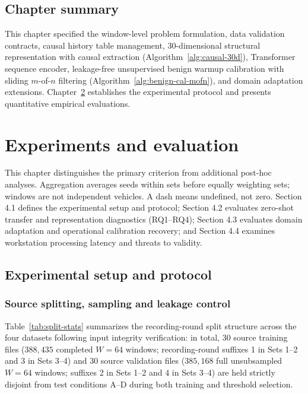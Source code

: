 \documentclass[12pt, a4paper, reqno, oneside]{book}
\begin{document}
\section{Chapter summary}
This chapter specified the window-level problem formulation, data validation contracts, causal history table management, 30-dimensional structural representation with causal extraction (Algorithm~\ref{alg:causal-30d}), Transformer sequence encoder, leakage-free unsupervised benign warmup calibration with sliding $m$-of-$n$ filtering (Algorithm~\ref{alg:benign-cal-mofn}), and domain adaptation extensions. Chapter~\ref{chap:results} establishes the experimental protocol and presents quantitative empirical evaluations.

\chapter{Experiments and evaluation}\label{chap:results}
This chapter distinguishes the primary criterion from additional post-hoc analyses. Aggregation averages seeds within sets before equally weighting sets; windows are not independent vehicles. A dash means undefined, not zero. Section 4.1 defines the experimental setup and protocol; Section 4.2 evaluates zero-shot transfer and representation diagnostics (RQ1--RQ4); Section 4.3 evaluates domain adaptation and operational calibration recovery; and Section 4.4 examines workstation processing latency and threats to validity.

\section{Experimental setup and protocol}
\subsection{Source splitting, sampling and leakage control}
Table~\ref{tab:split-stats} summarizes the recording-round split structure across the four datasets following input integrity verification: in total, 30 source training files ($388{,}435$ completed $W=64$ windows; recording-round suffixes 1 in Sets 1--2 and 3 in Sets 3--4) and 30 source validation files ($385{,}168$ full unsubsampled $W=64$ windows; suffixes 2 in Sets 1--2 and 4 in Sets 3--4) are held strictly disjoint from test conditions A--D during both training and threshold selection.
\end{document}
